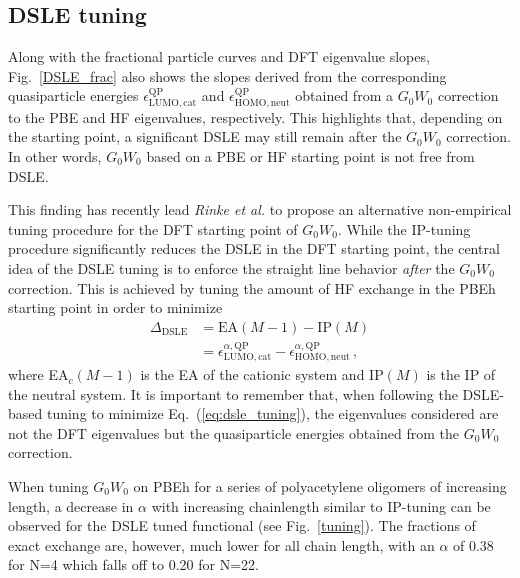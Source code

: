 \documentclass[journal=jctcce,manuscript=article,layout=twocolumn]{achemso}
\begin{document}
\subsection*{DSLE tuning}
Along with the fractional particle curves and DFT eigenvalue slopes, Fig.~\ref{DSLE_frac} also shows the
slopes derived from the corresponding quasiparticle energies $\epsilon^{\mathrm{QP}}_{\mathrm{LUMO,cat}}$ and $\epsilon^{\mathrm{QP}}_{\mathrm{HOMO,neut}}$ obtained from a $G_0W_0$ correction to the PBE and HF eigenvalues, respectively. This highlights that, depending on the starting point, a significant DSLE may still remain after the $G_0W_0$ correction. In other words, $G_0W_0$ based on a PBE or HF starting point is not free from DSLE. 

This finding has recently lead {\sl Rinke et al.} to propose an alternative non-empirical tuning procedure for the DFT starting point of $G_0W_0$.\cite{phys_rev_b_2016_dsle_tuning}
While the IP-tuning procedure significantly reduces the DSLE in the DFT starting point, the central idea of the DSLE tuning is to enforce the straight line behavior {\sl after} the $G_0W_0$ correction.
This is achieved by tuning the amount of HF exchange in the PBEh starting point in order to minimize
\begin{equation} \label{eq:dsle_tuning}
\begin{split}
\Delta_{\mathrm{DSLE}} &= \mathrm{EA}(M-1) - \mathrm{IP}(M) \\
    &= \epsilon^{\alpha,\mathrm{QP}}_{\mathrm{LUMO,cat}} - \epsilon^{\alpha,\mathrm{QP}}_{\mathrm{HOMO,neut}}\, ,
\end{split}
\end{equation}
where EA$_c(M-1)$ is the EA of the cationic system
and IP$(M)$ is the IP of the neutral system.
It is important to remember that, when following the DSLE-based tuning to minimize Eq.~(\ref{eq:dsle_tuning}), the eigenvalues considered are not the DFT eigenvalues but the quasiparticle energies obtained from 
the $G_0W_0$ correction.

When tuning $G_0W_0$ on PBEh for a series of polyacetylene oligomers of increasing length, a decrease in $\alpha$ with increasing chainlength similar to IP-tuning can be observed for the DSLE tuned functional (see Fig.~\ref{tuning}). 
The fractions of exact exchange are, however, much lower for all chain length, with an $\alpha$ of 0.38 for N=4 which falls off to 0.20 for N=22. 
\end{document}
